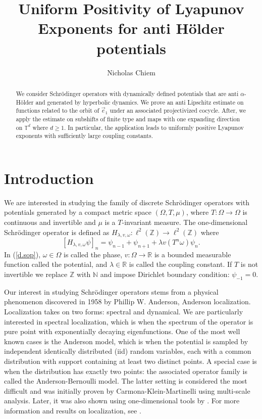 \documentclass{amsart}
\title[PLE anti Hölder]{Uniform Positivity of Lyapunov Exponents for anti H\"older potentials}
\author[N. Chiem]{Nicholas Chiem}
\newcommand{\NN}{\mathbb{N}}
\newcommand{\RR}{\mathbb{R}}
\newcommand{\TT}{\mathbb{T}}
\newcommand{\ZZ}{\mathbb{Z}}
\begin{document}
\begin{abstract}
    We consider Schr\"odinger operators with dynamically defined potentials that are anti $\alpha$-H\"older and generated by hyperbolic dynamics. We prove an anti Lipschitz estimate on functions related to the orbit of $\vec{e}_1$ under an associated projectivized cocycle. After, we apply the estimate on subshifts of finite type and maps with one expanding direction on $\TT^d$ where $d\geq 1$. In particular, the application leads to uniformly positive Lyapunov exponents with sufficiently large coupling constants. 
\end{abstract}

\maketitle

\section{Introduction}

We are interested in studying the family of discrete Schr\"odinger operators with potentials generated by a compact metric space $(\Omega, T, \mu)$, where $T:\Omega\rightarrow \Omega$ is continuous and invertible and $\mu$ is a $T$-invariant measure. The one-dimensional Schr\"odinger operator is defined as $H_{\lambda,v,\omega}:\ell^2(\ZZ) \rightarrow \ell^2(\ZZ)$ where
\begin{equation}\label{d.sop}
    [H_{\lambda, v, \omega}\psi]_n = \psi_{n-1} + \psi_{n+1} + \lambda v(T^n\omega)\psi_n.
\end{equation}
In (\ref{d.sop}), $\omega\in \Omega$ is called the phase, $v: \Omega \rightarrow \RR$ is a bounded measurable function called the potential, and $\lambda\in \RR$ is called the coupling constant. If $T$ is not invertible we replace $\ZZ$ with $\NN$ and impose Dirichlet boundary condition: $\psi_{-1} = 0$.

Our interest in studying Schr\"odinger operators stems from a physical phenomenon discovered in 1958 by Phillip W. Anderson, Anderson localization. Localization takes on two forms: spectral and dynamical. We are particularly interested in spectral localization, which is when the spectrum of the operator is pure point with exponentially decaying eigenfunctions. One of the most well known cases is the Anderson model, which is when the potential is sampled by independent identically distributed (iid) random variables, each with a common distribution with support containing at least two distinct points. A special case is when the distribution has exactly two points: the associated operator family is called the Anderson-Bernoulli model. The latter setting is considered the most difficult and was initially proven by Carmona-Klein-Martinelli \cite{ckm} using multi-scale analysis. Later, it was also shown using one-dimensional tools by \cite{AvDaZh2, bdf+, gk, gz, jz, svw}. For more information and results on localization, see \cite{ak, DJ1, ds, gb, gek1, gek2, gek3, JK1, JK2, jz}.
\end{document}
